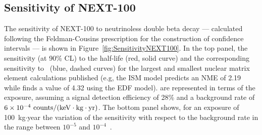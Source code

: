 \subsection{Sensitivity of NEXT-100}
The sensitivity of NEXT-100 to neutrinoless double beta decay --- calculated following the Feldman-Cousins prescription for the construction of confidence intervals \cite{Feldman:1997qc, GomezCadenas:2010gs} --- is shown in Figure~\ref{fig:SensitivityNEXT100}. In the top panel, the sensitivity (at 90\% CL) to the half-life (red, solid curve) and the corresponding sensitivity to \mbb\ (blue, dashed curves) for the largest and smallest nuclear matrix element calculations published (e.g, the ISM model predicts an NME of 2.19 \cite{Menendez:2008jp} 
while  \cite{Yao:2014uta} finds a value of 4.32 using the EDF model). 
are represented in terms of the exposure, assuming a signal detection efficiency of 28\% and a background rate of $6\times10^{-4}~\rm counts/(keV \cdot kg \cdot yr)$. The bottom panel shows, for an exposure of 100~kg$\cdot$year the variation of the sensitivity with respect to the background rate in the range between $10^{-5}$ and $10^{-4}$~\ckky.


